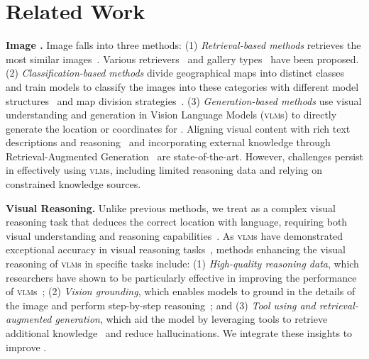 \section{Related Work}

\textbf{Image \geoloc.}
Image \geoloc falls into three
methods: (1) \textit{Retrieval-based methods}
retrieves the most similar images~\cite{hays2008im2gps, zhu2023r2former}. Various
retrievers~\cite{vo2017revisiting, pramanick2022world,
haas2023learning} and gallery types~\cite{vivanco2024geoclip} have
been proposed.
(2) \textit{Classification-based
methods} divide geographical maps into distinct classes
and train models to classify
the images into these categories with different model structures~\cite{radford2021learning,
wu2022im2city} and map division strategies~\cite{weyand2016planet,
theiner2022interpretable, haas2024pigeon}. 
(3) \textit{Generation-based methods} use visual understanding and generation in Vision
Language Models (\textsc{vlm}s) to directly generate the location or
coordinates for \geoloc. Aligning visual content with rich
text descriptions and reasoning~\cite{jia2024g3, ligeoreasoner,
zhang2024can} and incorporating external knowledge through
Retrieval-Augmented Generation~\cite{luo2022g, zhou2024img2loc} are state-of-the-art. However, challenges
persist in effectively using \textsc{vlm}s, including limited reasoning
data and relying on constrained knowledge
sources.

\textbf{Visual Reasoning.}
Unlike previous methods, we treat \geoloc as a complex visual reasoning task that deduces the correct location with language, requiring both visual
understanding and reasoning capabilities~\cite{hudson2019gqa,
gupta2023visual}.
As \textsc{vlm}s have demonstrated exceptional accuracy in visual
reasoning tasks~\cite{alayrac2022flamingo, lu2024chameleon}, methods enhancing the visual reasoning of \textsc{vlm}s in specific tasks include:
(1) \textit{High-quality reasoning data}, which researchers
have shown to be particularly effective in improving the performance
of \textsc{vlm}s~\cite{du2023makes, chen2023shikra}; (2) \textit{Vision
grounding}, which enables models to ground in the details of the image
and perform step-by-step reasoning~\cite{qi2024cogcom, wu2023textit,
zhang2024can}; and (3) \textit{Tool using and retrieval-augmented generation},
which aid the model by leveraging tools to retrieve additional knowledge~\cite{yang2023mm, marino2021krisp, chen2022lako} and reduce hallucinations. 
We integrate these insights to improve \modelname.